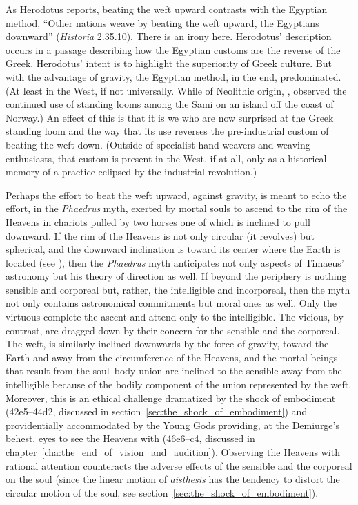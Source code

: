 As Herodotus reports, beating the weft upward contrasts with the Egyptian method, ``Other nations weave by beating the weft upward, the Egyptians downward'' (\emph{Historia} 2.35.10). There is an irony here. Herodotus' description occurs in a passage describing how the Egyptian customs are the reverse of the Greek. Herodotus' intent is to highlight the superiority of Greek culture. But with the advantage of gravity, the Egyptian method, in the end, predominated. (At least in the West, if not universally. While of Neolithic origin, \citealt[1--2]{Hoffmann:1964aa}, observed the continued use of standing looms among the Sami on an island off the coast of Norway.) An effect of this is that it is we who are now surprised at the Greek standing loom and the way that its use reverses the pre-industrial custom of beating the weft down. (Outside of specialist hand weavers and weaving enthusiasts, that custom is present in the West, if at all, only as a historical memory of a practice eclipsed by the industrial revolution.)

Perhaps the effort to beat the weft upward, against gravity, is meant to echo the effort, in the \emph{Phaedrus} myth, exerted by mortal souls to ascend to the rim of the Heavens in chariots pulled by two horses one of which is inclined to pull downward. If the rim of the Heavens is not only circular (it revolves) but spherical, and the downward inclination is toward its center where the Earth is located (see \citealt[114--5]{Dicks:1970aa}), then the \emph{Phaedrus} myth anticipates not only aspects of Timaeus' astronomy but his theory of direction as well. If beyond the periphery is nothing sensible and corporeal but, rather, the intelligible and incorporeal, then the myth not only contains astronomical commitments but moral ones as well. Only the virtuous complete the ascent and attend only to the intelligible. The vicious, by contrast, are dragged down by their concern for the sensible and the corporeal. The weft, is similarly inclined downwards by the force of gravity, toward the Earth and away from the circumference of the Heavens, and the mortal beings that result from the soul--body union are inclined to the sensible away from the intelligible because of the bodily component of the union represented by the weft. Moreover, this is an ethical challenge dramatized by the shock of embodiment (42e5--44d2, discussed in section~\ref{sec:the_shock_of_embodiment}) and providentially accommodated by the Young Gods providing, at the Demiurge's behest, eyes to see the Heavens with (46e6–c4, discussed in chapter~\ref{cha:the_end_of_vision_and_audition}). Observing the Heavens with rational attention counteracts the adverse effects of the sensible and the corporeal on the soul (since the linear motion of \emph{aisthēsis} has the tendency to distort the circular motion of the soul, see section~\ref{sec:the_shock_of_embodiment}).

